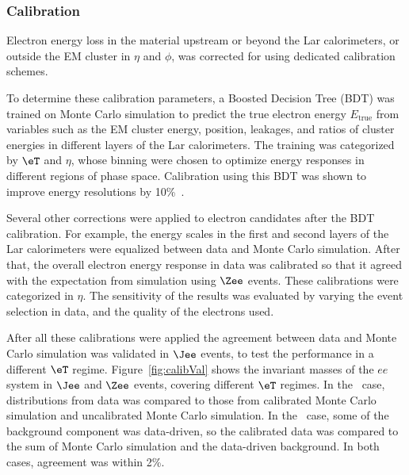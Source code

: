 \subsubsection{Calibration}
\par Electron energy loss in the material upstream or beyond the Lar calorimeters, or outside 
the EM cluster in $\eta$ and $\phi$, was corrected for using dedicated calibration schemes. 

\par To determine these calibration parameters, a Boosted Decision Tree (BDT) was trained on Monte Carlo 
simulation to predict the true electron energy $E_{\text{true}}$ from variables such as the EM cluster 
energy, position, leakages, and ratios of cluster energies in different layers of the Lar calorimeters. 
The training was categorized by $\eT$ and $\eta$, whose binning were chosen to optimize energy responses 
in different regions of phase space. Calibration using this BDT was shown to improve energy 
resolutions by 10\%~\cite{Aad:2014nim}.  

\par Several other corrections were applied to electron candidates after the BDT calibration. For example, 
the energy scales in the first and second layers of the Lar calorimeters were equalized between data 
and Monte Carlo simulation. After that, the overall electron energy response in data was 
calibrated so that it agreed with the expectation from simulation using $\Zee$ events. These calibrations 
were categorized in $\eta$. The sensitivity of the results was evaluated by varying the event selection 
in data, and the quality of the electrons used. 

\par After all these calibrations were applied the agreement between 
data and Monte Carlo simulation was validated in $\Jee$ events, to test the performance in 
a different $\eT$ regime. Figure~\ref{fig:calibVal} shows the invariant masses of the $ee$ 
system in $\Jee$ and $\Zee$ events, covering different $\eT$ regimes. In the \Zee\ case, distributions from data was 
compared to those from calibrated Monte Carlo simulation and uncalibrated Monte Carlo simulation.  
In the \Jee\ case, some of the background component was data-driven, so the calibrated data was 
compared to the sum of Monte Carlo simulation and the data-driven background. 
In both cases, agreement was within 2\%. 


